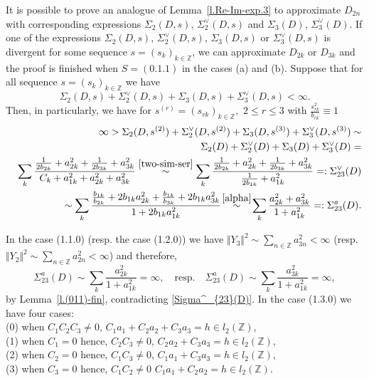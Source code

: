 \documentclass[preprint,12pt]{elsarticle}
\newcommand{\commA}[1]{\marginpar{%
\begin{color}{red}
\vskip-\baselineskip %
\raggedright\footnotesize
\itshape\hrule \smallskip A: #1\par\smallskip\hrule\end{color}}}
\numberwithin{equation}{section}
\begin{document}
\begin{rem}
\label{r.Re-Im-(011)}
It is possible to prove an
analogue of
Lemma~\ref{l.Re-Im-exp.3} to approximate $D_{2n}$ with corresponding expressions $\Sigma_2(D,s),\,\Sigma^{\vee}_2(D,s)$ and $\Sigma_3(D),\,\Sigma^{\vee}_3(D)$. 
If one of the expressions $\Sigma_2(D,s),\,\Sigma^{\vee}_2(D,s),\,\Sigma_3(D,s)$ or $\Sigma^{\vee}_3(D,s)$ is divergent for some sequence $s=(s_k)_{k\in \mathbb Z}$, we can approximate $D_{2k}$ or $D_{3k}$ and the proof is finished when  $S=(0.1.1)$ in the cases (a) and  (b).
Suppose that for all sequence $s=(s_k)_{k\in \mathbb Z}$ we have
\begin{equation*}
\Sigma_2(D,s)+\Sigma^{\vee}_2(D,s)+ \Sigma_3(D,s)+\Sigma^{\vee}_3(D,s)<\infty.
\end{equation*}
Then, in particularly, we have for $s^{(r)}=(s_{rk})_{k\in \mathbb Z},\,\,2\leq r\leq 3$
with $\frac{s^2_{rk}}{b_{rk}}\equiv 1$
\begin{eqnarray}
\nonumber 
&& 
 \infty>\Sigma_2(D,s^{(2)})+\Sigma^{\vee}_2(D,s^{(2)})+ \Sigma_3(D,s^{(3)})+\Sigma^{\vee}_3(D,s^{(3)})\sim\\
\label{Sigma^_{23}(D)}
&&
\Sigma_2(D)+\Sigma^{\vee}_2(D)+ \Sigma_3(D)+\Sigma^{\vee}_3(D)=\\
\nonumber
&&
\sum_k\frac{
\frac{1}{2b_{2k}}+a^2_{2k}+\frac{1}{2b_{3k}}+a^2_{3k}}{C_k+a^2_{1k}+a^2_{2k}+a^2_{3k}}\stackrel{\eqref{two-sim-ser}}{\sim}
\sum_k\frac{
\frac{1}{2b_{2k}}+a^2_{2k}+\frac{1}{2b_{3k}}+a^2_{3k}}{\frac{1}{2b_{1k}}+a^2_{1k}}
=:\Sigma^{\vee}_{23}(D)\\
\nonumber
&&
\sim \sum_k\frac{
\frac{b_{1k}}{b_{2k}}+2b_{1k}a^2_{2k}+\frac{b_{1k}}{b_{3k}}+2b_{1k}a^2_{3k}}{1+2b_{1k}a^2_{1k}}\!\stackrel{\eqref{alpha}}{\sim}\!
\sum_k\frac{
a^2_{2k}+a^2_{3k}
}
{1+a^2_{1k}}
=:\Sigma^{a}_{23}(D).
\end{eqnarray}
\end{rem}
%
%
\begin{rem}
\label{r.Re-Im-10-30}
In the case (1.1.0) (resp. the case (1.2.0)) we have $\Vert Y_3 \Vert^2\sim\sum_{n\in \mathbb Z}a_{3n}^2<\infty$
(resp.  $\Vert Y_2 \Vert^2\sim\sum_{n\in \mathbb Z}a_{2n}^2<\infty$) and therefore,
$$
\Sigma^{a}_{23}(D)\sim
\sum_k\frac{a^2_{2k}}{1+a^2_{1k}}=\infty,\quad \text{resp.}\quad
\Sigma^{a}_{23}(D)\sim
\sum_k\frac{a^2_{3k}}{1+a^2_{1k}}=\infty,
$$
by Lemma~\ref{l.(011)-fin}, contradicting \eqref{Sigma^_{23}(D)}.
In the case (1.3.0) we have four cases:\\
(0) when $C_1C_2C_3\not=0$, $C_1a_1+C_2a_2+C_3a_3=h\in l_2(\mathbb Z)$,\\
(1) when $C_1=0$ hence, $C_2C_3\not=0$, $C_2a_2+C_3a_3=h\in l_2(\mathbb Z)$,\\
(2) when $C_2=0$ hence, $C_1C_3\not=0$, $C_1a_1+C_3a_3=h\in l_2(\mathbb Z)$,\\
(3) when $C_3=0$ hence, $C_1C_2\not=0$ $C_1a_1+C_2a_2=h\in l_2(\mathbb Z)$.
\end{rem}
\end{document}
